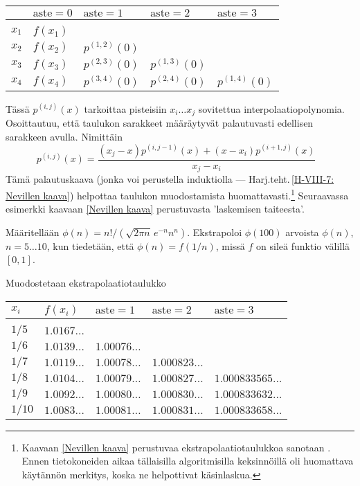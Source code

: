 \begin{center}
\begin{tabular}{lllll}
 & $\text{aste}=0$ & $\text{aste}=1$ & $\text{aste}=2$ & $\text{aste}=3$ \\ \hline \\
$x_1$ & $f(x_1)$ \\
$x_2$ & $f(x_2)$ & $p^{(1,2)}(0)$ \\
$x_3$ & $f(x_3)$ & $p^{(2,3)}(0)$ & $p^{(1,3)}(0)$ \\
$x_4$ & $f(x_4)$ & $p^{(3,4)}(0)$ & $p^{(2,4)}(0)$ & $p^{(1,4)}(0)$
\end{tabular}
\end{center}
Tässä $p^{(i,j)}(x)$ tarkoittaa pisteisiin $x_i\ldots x_j$ sovitettua interpolaatiopolynomia. 
Osoittautuu, että taulukon sarakkeet määräytyvät palautuvasti edellisen sarakkeen avulla. 
Nimittäin
\begin{equation} \label{Nevillen kaava}
\boxed{\ p^{(i,j)}(x)=\frac{(x_j-x)p^{(i,j-1)}(x)+(x-x_i)p^{(i+1,j)}(x)}{x_j-x_i} \quad}
\end{equation}
Tämä palautuskaava (jonka voi perustella induktiolla --- 
Harj.teht.\,\ref{H-VIII-7: Nevillen kaava}) helpottaa taulukon muodostamista 
huomattavasti.\footnote[2]{Kaavaan \eqref{Nevillen kaava} perustuvaa ekstrapolaatiotaulukkoa 
sanotaan . Ennen tietokoneiden aikaa tällaisilla algoritmisilla 
keksinnöillä oli huomattava käytännön merkitys, koska ne helpottivat käsinlaskua.} 
Seuraavassa esimerkki kaavaan \eqref{Nevillen kaava} perustuvasta 'laskemisen taiteesta'.
\begin{Exa} \label{Neville}
Määritellään $\phi(n)=n!/(\sqrt{2\pi n}\,e^{-n}n^n)$. Ekstrapoloi $\phi(100)$ arvoista 
$\phi(n)$, $n=5\ldots 10$, kun tiedetään, että $\phi(n)=f(1/n)$, missä $f$ on sileä funktio 
välillä $[0,1]$.
\end{Exa}
\ratk Muodostetaan ekstrapolaatiotaulukko

\begin{center}
\begin{tabular}{lllll}
$x_i$ & $f(x_i)$ & $\text{aste}=1$ & $\text{aste}=2$ & $\text{aste}=3$ \\ \hline \\
$1/5$ & $1.0167\ldots$ \\
$1/6$ & $1.0139\ldots$ & $1.00076\ldots$ \\
$1/7$ & $1.0119\ldots$ & $1.00078\ldots$ & $1.000823\ldots$ \\
$1/8$ & $1.0104\ldots$ & $1.00079\ldots$ & $1.000827\ldots$ & $1.000833565\ldots$ \\
$1/9$ & $1.0092\ldots$ & $1.00080\ldots$ & $1.000830\ldots$ & $1.000833632\ldots$ \\
$1/10$ & $1.0083\ldots$ & $1.00081\ldots$ & $1.000831\ldots$ & $1.000833658\ldots$
\end{tabular}
\end{center}

